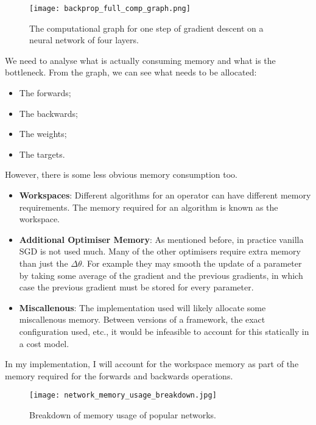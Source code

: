 \begin{figure}[t]
    \centering
    \texttt{[image: backprop\_full\_comp\_graph.png]}
    \caption{The computational graph for one step of gradient descent on a neural network of four layers.}
    \label{fig:2-nn-comp-graph-2}
\end{figure}

We need to analyse what is actually consuming memory and what is the bottleneck. From the graph, we can see what needs to be allocated:
\begin{itemize}[topsep=0.1em]
    \item The forwards;
    \item The backwards;
    \item The weights;
    \item The targets.
\end{itemize}
However, there is some less obvious memory consumption too.
\begin{itemize}[topsep=0.1em]
    \item \textbf{Workspaces}: Different algorithms for an operator can have different memory requirements. The memory required for an algorithm is known as the workspace.
    \item \textbf{Additional Optimiser Memory}: As mentioned before, in practice vanilla SGD is not used much. Many of the other optimisers require extra memory than just the \(\Delta\theta\). For example they may smooth the update of a parameter by taking some average of the gradient and the previous gradients, in which case the previous gradient must be stored for every parameter.
    \item \textbf{Miscallenous}: The implementation used will likely allocate some miscallenous memory. Between versions of a framework, the exact configuration used, etc., it would be infeasible to account for this statically in a cost model.
\end{itemize}

In my implementation, I will account for the workspace memory as part of the memory required for the forwards and backwards operations.

\begin{figure}[b]
    \centering
    \texttt{[image: network\_memory\_usage\_breakdown.jpg]}
    \caption{Breakdown of memory usage of popular networks. \cite[Figure~4]{Rhu2016}}
    \label{fig:2-memory-breakdown}
\end{figure}

